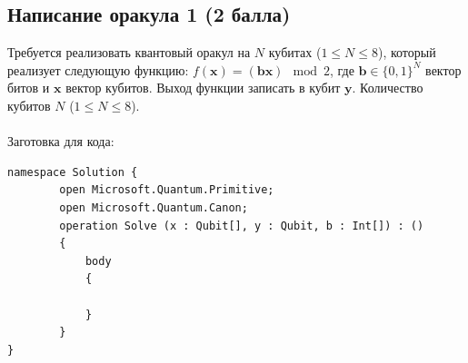\documentclass{article}
\begin{document}
\subsection{Написание оракула 1 (2 балла)}

Требуется реализовать квантовый оракул на $N$ кубитах ($1 \le N \le 8$), который реализует следующую функцию: $f(\pmb{x}) = (\pmb{b}\pmb{x}) \mod 2$, где  $\pmb{b} \in \{0,1\}^N$ вектор битов и  $\pmb{x}$ вектор кубитов. Выход функции записать в кубит $\pmb{y}$. Количество кубитов $N$ ($1 \le N \le 8$). 
\\\\
Заготовка для кода:
\begin{lstlisting}
namespace Solution {
        open Microsoft.Quantum.Primitive;
        open Microsoft.Quantum.Canon;
        operation Solve (x : Qubit[], y : Qubit, b : Int[]) : ()
        {
            body
            {

            }
        }
}
\end{lstlisting}
\end{document}
